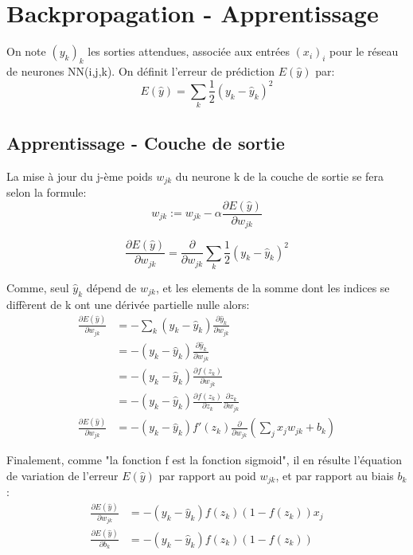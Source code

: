 \documentclass{article}
\begin{document}
\newpage

\section{Backpropagation - Apprentissage}

On note $(y_k)_k$ les sorties attendues, associée aux entrées $(x_i)_i$ pour le réseau de neurones NN(i,j,k). On définit l'erreur de prédiction $E(\hat{y})$ par:
\begin{equation}
E(\hat{y})=\sum_k{\frac{1}{2}(y_k-\hat{y}_k)^2}
\end{equation}

\subsection{Apprentissage - Couche de sortie}

La mise à jour du j-ème poids $w_{jk}$ du neurone k de la couche de sortie se fera selon la formule: 
\begin{equation}
w_{jk}:=w_{jk}-\alpha\frac{\partial{E(\hat{y})}}{\partial{w_{jk}}}
\end{equation}

\begin{equation}
\frac{\partial{E(\hat{y})}}{\partial{w_{jk}}}=\frac{\partial{}}{\partial{w_{jk}}}\sum_k{\frac{1}{2}(y_k-\hat{y}_k)^2}
\end{equation}

Comme, seul $\hat{y}_k$ dépend de $w_{jk}$, et les elements de la somme dont les indices se diffèrent de k ont une dérivée partielle nulle alors:
\begin{equation}
\begin{split}
\frac{\partial{E(\hat{y})}}{\partial{w_{jk}}}&=-\sum_k{(y_k-\hat{y}_k)\frac{\partial{\hat{y}_k}}{\partial{w_{jk}}}}\\
&=-(y_k-\hat{y}_k)\frac{\partial{\hat{y}_k}}{\partial{w_{jk}}}\\
&=-(y_k-\hat{y}_k)\frac{\partial{f(z_k)}}{\partial{w_{jk}}}\\
&=-(y_k-\hat{y}_k)\frac{\partial{f(z_k)}}{\partial{z_k}}\frac{\partial{z_k}}{\partial{w_{jk}}}\\
\frac{\partial{E(\hat{y})}}{\partial{w_{jk}}}
&=-(y_k-\hat{y}_k){f'(z_k)}\frac{\partial{}}{\partial{w_{jk}}}(\sum_j{{x_j}w_{jk}}+b_k)
\end{split}
\end{equation}

Finalement, comme "la fonction f est la fonction sigmoid", il en résulte l'équation de variation de l'erreur $E(\hat{y})$ par rapport au poid $w_{jk}$, et par rapport au biais $b_k$:
\begin{align*}
\frac{\partial{E(\hat{y})}}{\partial{w_{jk}}}&=-(y_k-\hat{y}_k)f(z_k)(1-f(z_k))x_j\\\frac{\partial{E(\hat{y})}}{\partial{b_k}}&=-(y_k-\hat{y}_k)f(z_k)(1-f(z_k))
\end{align*}
\end{document}
